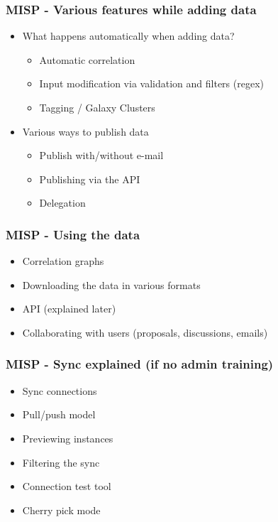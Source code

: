 \begin{frame}
    \frametitle{MISP - Various features while adding data}
    \begin{itemize}
        \item What happens automatically when adding data?
        \begin{itemize}
            \item Automatic correlation
            \item Input modification via validation and filters (regex)
            \item Tagging / Galaxy Clusters
        \end{itemize}
        \item Various ways to publish data
        \begin{itemize}
            \item Publish with/without e-mail
            \item Publishing via the API
            \item Delegation
        \end{itemize}
    \end{itemize}
\end{frame}

\begin{frame}
    \frametitle{MISP - Using the data}
    \begin{itemize}
        \item Correlation graphs
        \item Downloading the data in various formats
        \item API (explained later)
        \item Collaborating with users (proposals, discussions, emails)
    \end{itemize}
\end{frame}

\begin{frame}
    \frametitle{MISP - Sync explained (if no admin training)}
    \begin{itemize}
        \item Sync connections
        \item Pull/push model
        \item Previewing instances
        \item Filtering the sync
        \item Connection test tool
        \item Cherry pick mode
    \end{itemize}
\end{frame}

